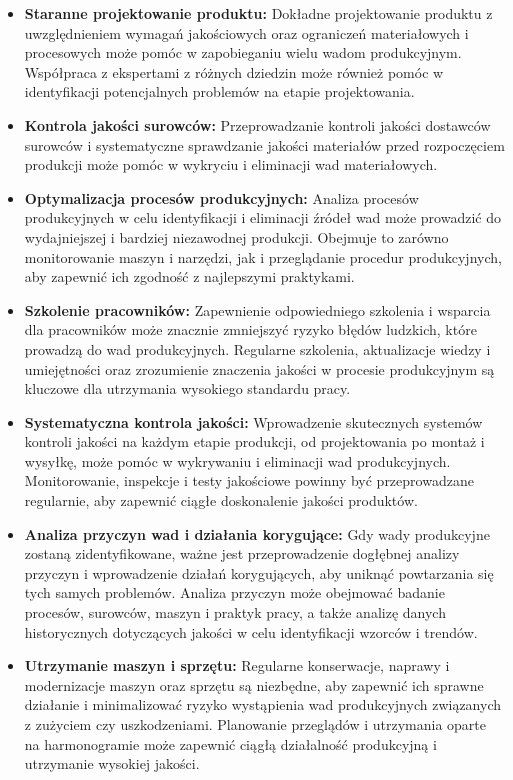 \begin{itemize}
\item \textbf{Staranne projektowanie produktu:} Dokładne projektowanie produktu z uwzględnieniem wymagań jakościowych oraz ograniczeń materiałowych i procesowych może pomóc w zapobieganiu wielu wadom produkcyjnym. Współpraca z ekspertami z różnych dziedzin może również pomóc w identyfikacji potencjalnych problemów na etapie projektowania.

\item \textbf{Kontrola jakości surowców:} Przeprowadzanie kontroli jakości dostawców surowców i systematyczne sprawdzanie jakości materiałów przed rozpoczęciem produkcji może pomóc w wykryciu i eliminacji wad materiałowych.

\item \textbf{Optymalizacja procesów produkcyjnych:} Analiza procesów produkcyjnych w celu identyfikacji i eliminacji źródeł wad może prowadzić do wydajniejszej i bardziej niezawodnej produkcji. Obejmuje to zarówno monitorowanie maszyn i narzędzi, jak i przeglądanie procedur produkcyjnych, aby zapewnić ich zgodność z najlepszymi praktykami.

\item \textbf{Szkolenie pracowników:} Zapewnienie odpowiedniego szkolenia i wsparcia dla pracowników może znacznie zmniejszyć ryzyko błędów ludzkich, które prowadzą do wad produkcyjnych. Regularne szkolenia, aktualizacje wiedzy i umiejętności oraz zrozumienie znaczenia jakości w procesie produkcyjnym są kluczowe dla utrzymania wysokiego standardu pracy.

\item \textbf{Systematyczna kontrola jakości:} Wprowadzenie skutecznych systemów kontroli jakości na każdym etapie produkcji, od projektowania po montaż i wysyłkę, może pomóc w wykrywaniu i eliminacji wad produkcyjnych. Monitorowanie, inspekcje i testy jakościowe powinny być przeprowadzane regularnie, aby zapewnić ciągłe doskonalenie jakości produktów.

\item \textbf{Analiza przyczyn wad i działania korygujące:} Gdy wady produkcyjne zostaną zidentyfikowane, ważne jest przeprowadzenie dogłębnej analizy przyczyn i wprowadzenie działań korygujących, aby uniknąć powtarzania się tych samych problemów. Analiza przyczyn może obejmować badanie procesów, surowców, maszyn i praktyk pracy, a także analizę danych historycznych dotyczących jakości w celu identyfikacji wzorców i trendów.

\item \textbf{Utrzymanie maszyn i sprzętu:} Regularne konserwacje, naprawy i modernizacje maszyn oraz sprzętu są niezbędne, aby zapewnić ich sprawne działanie i minimalizować ryzyko wystąpienia wad produkcyjnych związanych z zużyciem czy uszkodzeniami. Planowanie przeglądów i utrzymania oparte na harmonogramie może zapewnić ciągłą działalność produkcyjną i utrzymanie wysokiej jakości.


\end{itemize}
